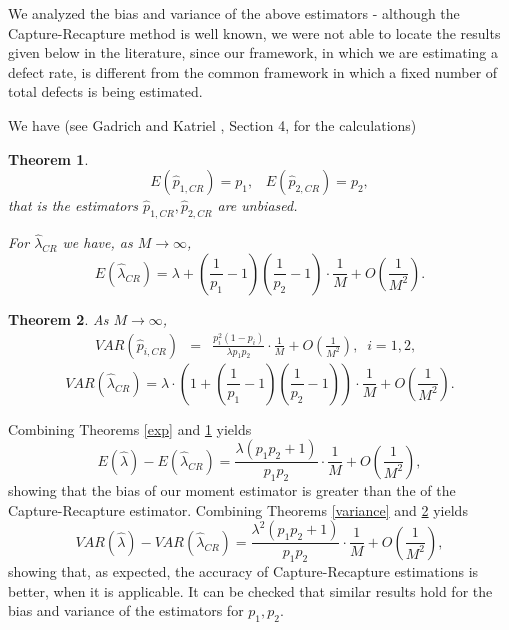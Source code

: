 \documentclass[a4paper,10pt,twoside]{article}
\newtheorem{theorem}{Theorem}
\begin{document}
{We analyzed the bias and variance of the above estimators - although the Capture-Recapture method is well known, we were
not able to locate the results given below in the literature, since our framework, in which we are estimating a defect rate, is different from the common framework in which a fixed number of total defects is being estimated.

We have (see Gadrich and Katriel \cite{gadrich}, Section 4, for the calculations)
\begin{theorem}\label{expmse}
	$$E(\hat{p}_{1,CR})=p_1,\;\;\; E(\hat{p}_{2,CR})=p_2,$$
	that is the estimators $\hat{p}_{1,CR},\hat{p}_{2,CR} $ are unbiased.
	
	For $\hat{\lambda}_{CR}$ we have, as $M\rightarrow \infty$,
	$$E(\hat{\lambda}_{CR})=\lambda + 
	\left(\frac{1}{p_1}-1 \right)\left(\frac{1}{p_2}-1 \right)
	\cdot \frac{1}{M} +O\left(\frac{1}{M^2} \right).$$
\end{theorem}

\begin{theorem}\label{variancemse}
	As $M\rightarrow \infty$,
	\begin{eqnarray}\label{varms1}
	VAR(\hat{p}_{i,CR})&=& \frac{p_i^2(1-p_i)}{ \lambda p_1 p_2}\cdot \frac{1}{M}+O\left(\frac{1}{M^2}\right),\;\;i=1,2,\;\;
	\end{eqnarray}
	\begin{equation}\label{varms3}
	VAR(\hat{\lambda}_{CR})=\lambda\cdot \left(1+\left(\frac{1}{p_1}-1 \right)\left(\frac{1}{p_2}-1 \right)\right)\cdot \frac{1}{M}+O\left(\frac{1}{M^2}\right).
	\end{equation}
\end{theorem}

Combining Theorems \ref{exp} and \ref{expmse} yields
$$E(\hat{\lambda})-E(\hat{\lambda}_{CR})=\frac{ \lambda (p_1p_2+1)  }{p_1 p_2}\cdot \frac{1}{M}+O\left(\frac{1}{M^2}\right),$$
showing that the bias of our moment estimator is greater than the of the Capture-Recapture estimator.
Combining Theorems \ref{variance} and \ref{variancemse} yields
$$VAR(\hat{\lambda})-VAR(\hat{\lambda}_{CR})= \frac{\lambda^2(p_1p_2+1)}{p_1p_2}\cdot \frac{1}{M}+O\left(\frac{1}{M^2}\right),$$
showing that, as expected, the accuracy of Capture-Recapture estimations is better,
when it is applicable. It can be checked that similar results hold for the bias and variance of the estimators for $p_1,p_2$.

}
\end{document}
